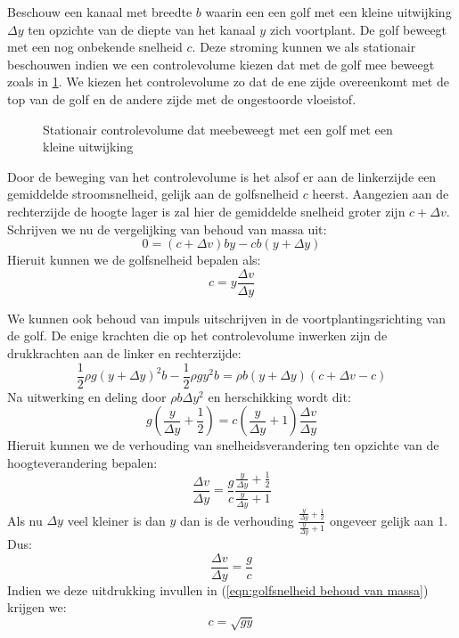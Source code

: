 Beschouw een kanaal met breedte $b$  waarin een een golf met een kleine uitwijking $\Delta y$ ten opzichte van de diepte van het kanaal $y$ zich voortplant. De golf beweegt met een nog onbekende snelheid $c$. Deze stroming kunnen we als stationair beschouwen indien we een controlevolume kiezen dat met de golf mee beweegt zoals in \ref{fig:Golfsnelheid}. We kiezen het controlevolume zo dat de ene zijde overeenkomt met de top van de golf en de andere zijde met de ongestoorde vloeistof.
\begin{figure}[htb]
	\centering
	
	\caption{Stationair controlevolume dat meebeweegt met een golf met een kleine uitwijking}
	\label{fig:Golfsnelheid}
\end{figure}
Door de beweging van het controlevolume is het alsof er aan de linkerzijde een gemiddelde stroomsnelheid, gelijk aan de golfsnelheid $c$ heerst. Aangezien aan de rechterzijde de hoogte lager is zal hier de gemiddelde snelheid groter zijn $c+\Delta v$. Schrijven we nu de vergelijking van behoud van massa uit:
\begin{equation}
	0 = (c+\Delta v) b y - c b (y+\Delta y)
\end{equation}
Hieruit kunnen we de golfsnelheid bepalen als:
\begin{equation}
	c = y \frac{\Delta v}{\Delta y}
	\label{eqn:golfsnelheid behoud van massa}
\end{equation}

We kunnen ook behoud van impuls uitschrijven in de voortplantingsrichting van de golf. De enige krachten die op het controlevolume inwerken zijn de drukkrachten aan de linker en rechterzijde:
\begin{equation}
	\frac{1}{2}\rho g (y+\Delta y)^2 b - \frac{1}{2}\rho g y^2 b = \rho b (y+\Delta y) (c+\Delta v-c)
\end{equation}
Na uitwerking en deling door $\rho b \Delta y^2$ en herschikking wordt dit:
\begin{equation}
	 g \left(\frac{y}{\Delta y} + \frac{1}{2}\right)  = c \left(\frac{y}{\Delta y} + 1\right)\frac{\Delta v}{\Delta y}
\end{equation}
Hieruit kunnen we de verhouding van snelheidsverandering ten opzichte van de hoogteverandering bepalen:
\begin{equation}
	\frac{\Delta v}{\Delta y} = \frac{g}{c} \frac{\frac{y}{\Delta y} + \frac{1}{2}}{\frac{y}{\Delta y} + 1}
\end{equation}
Als nu $\Delta y$ veel kleiner is dan $y$ dan is de verhouding $\frac{\frac{y}{\Delta y} + \frac{1}{2}}{\frac{y}{\Delta y} + 1}$ ongeveer gelijk aan 1. Dus:
\begin{equation}
	\frac{\Delta v}{\Delta y} = \frac{g}{c}
\end{equation}
Indien we deze uitdrukking invullen in (\ref{eqn:golfsnelheid behoud van massa}) krijgen we:
\begin{equation}
	c = \sqrt{g y}
	\label{eqn:golfsnelheid ondiep}
\end{equation}

